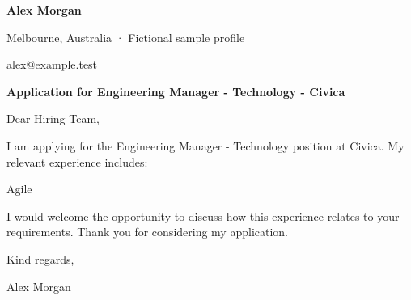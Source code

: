 \documentclass[10pt,a4paper]{article}
\begin{document}
{\LARGE\bfseries\color{navy} Alex Morgan}\par
Melbourne, Australia · Fictional sample profile\par
alex@example.test\par
{\large\bfseries\color{navy} Application for Engineering Manager - Technology - Civica}\par
Dear Hiring Team,\par
I am applying for the Engineering Manager - Technology position at Civica. My relevant experience includes:\par
Agile\par
I would welcome the opportunity to discuss how this experience relates to your requirements. Thank you for considering my application.\par
Kind regards,\par
Alex Morgan\par
\end{document}

